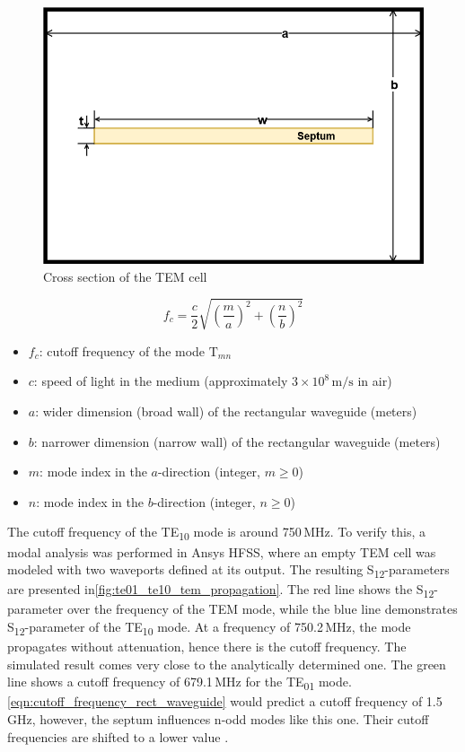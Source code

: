 \begin{figure}[h]
    \centering
    \includegraphics[width=0.5\linewidth]{content//10_theory//img/tem_cell_crosssection.png}
    \caption{Cross section of the TEM cell}
    \label{fig:tem_cell_crosssection}
\end{figure}

\begin{equation}
    f_c = \frac{c}{2} \sqrt{\left(\frac{m}{a}\right)^2 + \left(\frac{n}{b}\right)^2}
    \label{eqn:cutoff_frequency_rect_waveguide}
\end{equation}

\begin{itemize}
  \item \( f_c \): cutoff frequency of the mode \(\text{T}_{mn}\)
  \item \( c \): speed of light in the medium (approximately \(3 \times 10^8 \, \text{m/s}\) in air)
  \item \( a \): wider dimension (broad wall) of the rectangular waveguide (meters)
  \item \( b \): narrower dimension (narrow wall) of the rectangular waveguide (meters)
  \item \( m \): mode index in the \(a\)-direction (integer, \(m \geq 0\))
  \item \( n \): mode index in the \(b\)-direction (integer, \(n \geq 0\))
\end{itemize}

The cutoff frequency of the TE\textsubscript{10} mode is around 750\,MHz. To verify this, a modal analysis was performed in Ansys HFSS, where an empty TEM cell was modeled with two waveports defined at its output. The resulting S\textsubscript{12}-parameters are presented in\autoref{fig:te01_te10_tem_propagation}. The red line shows the S\textsubscript{12}-parameter over the frequency of the TEM mode, while the blue line demonstrates S\textsubscript{12}-parameter of the TE\textsubscript{10} mode. At a frequency of 750.2\,MHz, the mode propagates without attenuation, hence there is the cutoff frequency. The simulated result comes very close to the analytically determined one. The green line shows a cutoff frequency of 679.1\,MHz for the TE\textsubscript{01} mode. \autoref{eqn:cutoff_frequency_rect_waveguide} would predict a cutoff frequency of 1.5\,GHz, however, the septum influences n-odd modes like this one. Their cutoff frequencies are shifted to a lower value \cite{Weil_Gruner_1984}. 

